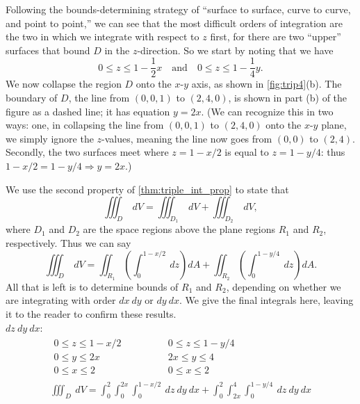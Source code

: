 {Following the bounds-determining strategy of ``surface to surface, curve to curve, and point to point,''  we can see that the most difficult orders of integration are the two in which we integrate with respect to $z$ first, for there are two ``upper'' surfaces that bound $D$ in the $z$-direction. So we start by noting that we have 
\[0\leq z\leq 1-\frac12x \quad\text{and}\quad 0\leq z\leq 1-\frac14y.\]
We now collapse the region $D$ onto the $x$-$y$ axis, as shown in \autoref{fig:trip4}(b). The boundary of $D$, the line from $(0,0,1)$ to $(2,4,0)$, is shown in part (b) of the figure as a dashed line; it has equation $y=2x$. (We can recognize this in two ways: one, in collapsing the line from $(0,0,1)$ to $(2,4,0)$ onto the $x$-$y$ plane, we simply ignore the $z$-values, meaning the line now goes from $(0,0)$ to $(2,4)$. Secondly, the two surfaces meet where $z=1-x/2$ is equal to $z=1-y/4$: thus $1-x/2=1-y/4 \Rightarrow y=2x.$)

We use the second property of \autoref{thm:triple_int_prop} to state that 
\[\iiint_D \ dV = \iiint_{D_1}\ dV + \iiint_{D_2}\ dV,\]
where $D_1$ and $D_2$ are the space regions above the plane regions $R_1$ and $R_2$, respectively. Thus we can say
\[\iiint_D\ dV = \iint_{R_1}\left(\int_0^{1-x/2}\ dz\right)dA + \iint_{R_2}\left(\int_0^{1-y/4}\ dz\right)dA.\]
All that is left is to determine bounds of $R_1$ and $R_2$, depending on whether we are integrating with order $dx\ dy$ or $dy\ dx$. We give the final integrals here, leaving it to the reader to confirm these results.\\

\noindent $dz\ dy\ dx$:\\[-2\baselineskip]
\begin{gather*}
 \begin{gathered}
  0\leq z\leq 1-x/2\\
  0\leq y\leq 2x\\
  0\leq x\leq 2
 \end{gathered}
 \qquad\qquad
 \begin{gathered}
  0\leq z\leq 1-y/4\\
  2x\leq y\leq 4\\
  0\leq x\leq 2
 \end{gathered} \\
 \iiint_D\ dV = \int_0^2\int_0^{2x}\int_0^{1-x/2}\ dz\ dy\ dx +\int_0^2\int_{2x}^4\int_0^{1-y/4}\ dz\ dy\ dx
\end{gather*}

}
